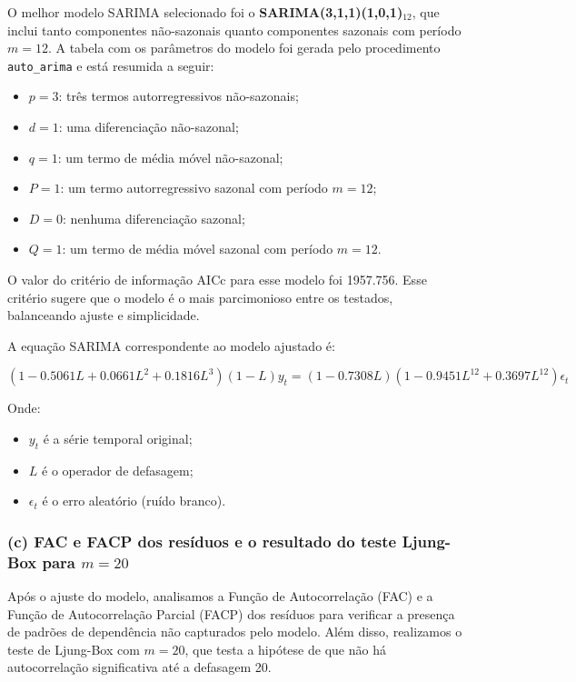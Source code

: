 \documentclass[a4paper, 12pt]{article}
\begin{document}
O melhor modelo SARIMA selecionado foi o \textbf{SARIMA(3,1,1)(1,0,1)$_{12}$}, que inclui tanto componentes não-sazonais quanto componentes sazonais com período \(m=12\). A tabela com os parâmetros do modelo foi gerada pelo procedimento \texttt{auto\_arima} e está resumida a seguir:

\begin{itemize}
    \item \(p = 3\): três termos autorregressivos não-sazonais;
    \item \(d = 1\): uma diferenciação não-sazonal;
    \item \(q = 1\): um termo de média móvel não-sazonal;
    \item \(P = 1\): um termo autorregressivo sazonal com período \(m=12\);
    \item \(D = 0\): nenhuma diferenciação sazonal;
    \item \(Q = 1\): um termo de média móvel sazonal com período \(m=12\).
\end{itemize}

O valor do critério de informação AICc para esse modelo foi 1957.756. Esse critério sugere que o modelo é o mais parcimonioso entre os testados, balanceando ajuste e simplicidade.

A equação SARIMA correspondente ao modelo ajustado é:

\[
(1 - 0.5061 L + 0.0661 L^2 + 0.1816 L^3)(1 - L) y_t = (1 - 0.7308 L)(1 - 0.9451 L^{12} + 0.3697 L^{12}) \epsilon_t
\]

Onde:
\begin{itemize}
    \item \(y_t\) é a série temporal original;
    \item \(L\) é o operador de defasagem;
    \item \(\epsilon_t\) é o erro aleatório (ruído branco).
\end{itemize}

\subsubsection{(c)  FAC e FACP dos resíduos e o resultado do teste Ljung-Box para \(m=20\)}

Após o ajuste do modelo, analisamos a Função de Autocorrelação (FAC) e a Função de Autocorrelação Parcial (FACP) dos resíduos para verificar a presença de padrões de dependência não capturados pelo modelo. Além disso, realizamos o teste de Ljung-Box com \(m=20\), que testa a hipótese de que não há autocorrelação significativa até a defasagem 20.
\end{document}
